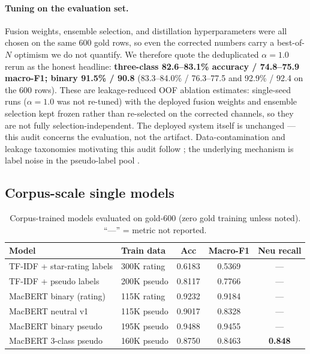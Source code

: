 \documentclass[11pt,a4paper]{article}
\begin{document}
\paragraph{Tuning on the evaluation set.} Fusion weights, ensemble
selection, and distillation hyperparameters were all chosen on the
same 600 gold rows, so even the corrected numbers carry a
best-of-$N$ optimism we do not quantify. We therefore quote the deduplicated
$\alpha{=}1.0$ rerun as the honest headline: \textbf{three-class
82.6--83.1\% accuracy / 74.8--75.9 macro-F1; binary
91.5\% / 90.8} (83.3--84.0\% / 76.3--77.5 and 92.9\% / 92.4 on the
600 rows). These are leakage-reduced OOF ablation
estimates: single-seed runs ($\alpha{=}1.0$ was not re-tuned) with the
deployed fusion weights and ensemble selection kept frozen rather than
re-selected on the corrected channels, so they are not fully
selection-independent. The deployed system itself is
unchanged --- this audit concerns the evaluation, not the artifact.
Data-contamination and leakage taxonomies motivating this audit
follow \citet{sainz2023,kapoor2023,balloccu2024}; the underlying
mechanism is label noise in the pseudo-label pool
\citep{northcutt2021}.

\subsection{Corpus-scale single models}

\begin{table}[H]
\centering\small
\caption{Corpus-trained models evaluated on gold-600 (zero gold
training unless noted). ``---'' = metric not reported.}
\label{tab:corpus}
\begin{tabular}{llccc}
\toprule
Model & Train data & Acc & Macro-F1 & Neu recall \\
\midrule
TF-IDF + star-rating labels & 300K rating  & 0.6183 & 0.5369 & ---    \\
TF-IDF + pseudo labels      & 200K pseudo  & 0.8117 & 0.7766 & ---    \\
MacBERT binary (rating)     & 115K rating  & 0.9232 & 0.9184 & ---    \\
MacBERT neutral v1          & 115K pseudo  & 0.9017 & 0.8328 & ---    \\
MacBERT binary pseudo       & 195K pseudo  & 0.9488 & 0.9455 & ---    \\
MacBERT 3-class pseudo      & 160K pseudo  & 0.8750 & 0.8463 & \textbf{0.848} \\
\bottomrule
\end{tabular}
\end{table}
\end{document}
